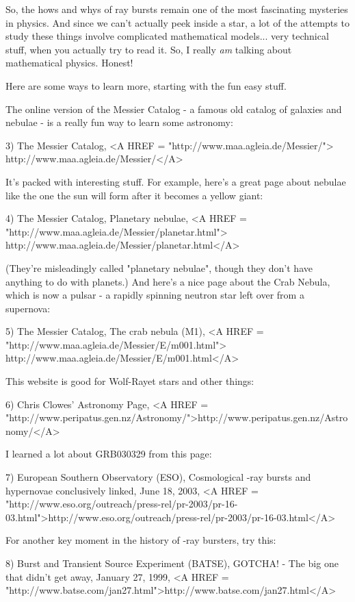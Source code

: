 So, the hows and whys of \gamma  ray bursts remain one of the most 
fascinating mysteries in physics.  And since we can't actually peek
inside a star, a lot of the attempts to study these things involve 
complicated mathematical models... very technical stuff, when you 
actually try to read it.  So, I really \emph{am} talking about mathematical 
physics.  Honest!

Here are some ways to learn more, starting with the fun easy stuff.

The online version of the Messier Catalog - a famous old catalog of
galaxies and nebulae - is a really fun way to learn some astronomy:

3) The Messier Catalog, <A HREF = "http://www.maa.agleia.de/Messier/">
http://www.maa.agleia.de/Messier/</A>

It's packed with interesting stuff.  For example, here's a great 
page about nebulae like the one the sun will form after it becomes 
a yellow giant:  

4) The Messier Catalog, Planetary nebulae, 
<A HREF = "http://www.maa.agleia.de/Messier/planetar.html">
http://www.maa.agleia.de/Messier/planetar.html</A>

(They're misleadingly called "planetary nebulae", though they
don't have anything to do with planets.)  And here's a nice page
about the Crab Nebula, which is now a pulsar - a rapidly spinning
neutron star left over from a supernova:

5) The Messier Catalog, The crab nebula (M1), 
<A HREF = "http://www.maa.agleia.de/Messier/E/m001.html">
http://www.maa.agleia.de/Messier/E/m001.html</A>

This website is good for Wolf-Rayet stars and other things:

6) Chris Clowes' Astronomy Page,
<A HREF = "http://www.peripatus.gen.nz/Astronomy/">http://www.peripatus.gen.nz/Astronomy/</A>

I learned a lot about GRB030329 from this page:

7) European Southern Observatory (ESO), Cosmological \gamma -ray 
bursts and hypernovae conclusively linked, June 18, 2003,
<A HREF = "http://www.eso.org/outreach/press-rel/pr-2003/pr-16-03.html">http://www.eso.org/outreach/press-rel/pr-2003/pr-16-03.html</A>

For another key moment in the history of \gamma -ray bursters, 
try this:

8) Burst and Transient Source Experiment (BATSE), 
GOTCHA! - The big one that didn't get away, January 27, 1999,
<A HREF = "http://www.batse.com/jan27.html">http://www.batse.com/jan27.html</A>

